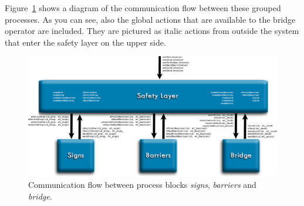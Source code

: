 %
Figure~\ref{fig:arch} shows a diagram of the communication flow between these grouped processes. As you can see, also the global actions that are available to the bridge operator are included. They are pictured as italic actions from outside the system that enter the safety layer on the upper side.
%
\begin{figure}[htb]%
\centering
\includegraphics[width=\columnwidth, angle=90]{Images/Architecture_2}%
\caption{Communication flow between process blocks \emph{signs}, \emph{barriers} and \emph{bridge}.}%
\label{fig:arch}%
\end{figure}
%

